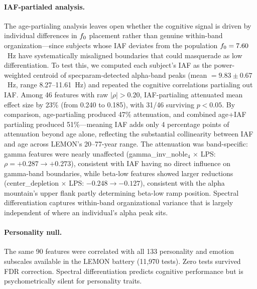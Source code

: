 \paragraph{IAF-partialed analysis.}
The age-partialing analysis leaves open whether the cognitive signal is driven by individual differences in $f_0$ placement rather than genuine within-band organization---since subjects whose IAF deviates from the population $f_0 = 7.60$~Hz have systematically misaligned boundaries that could masquerade as low differentiation. To test this, we computed each subject's IAF as the power-weighted centroid of specparam-detected alpha-band peaks (mean $= 9.83 \pm 0.67$~Hz, range 8.27--11.61~Hz) and repeated the cognitive correlations partialing out IAF. Among 46 features with raw $|\rho| > 0.20$, IAF-partialing attenuated mean effect size by 23\% (from 0.240 to 0.185), with 31/46 surviving $p < 0.05$. By comparison, age-partialing produced 47\% attenuation, and combined age+IAF partialing produced 51\%---meaning IAF adds only 4 percentage points of attenuation beyond age alone, reflecting the substantial collinearity between IAF and age across LEMON's 20--77-year range. The attenuation was band-specific: gamma features were nearly unaffected (gamma\_inv\_noble$_4$ $\times$ LPS: $\rho = +0.287 \to +0.273$), consistent with IAF having no direct influence on gamma-band boundaries, while beta-low features showed larger reductions (center\_depletion $\times$ LPS: $-0.248 \to -0.127$), consistent with the alpha mountain's upper flank partly determining beta-low ramp position. Spectral differentiation captures within-band organizational variance that is largely independent of where an individual's alpha peak sits.

\paragraph{Personality null.}
The same 90 features were correlated with all 133 personality and emotion subscales available in the LEMON battery (11,970 tests). Zero tests survived FDR correction. Spectral differentiation predicts cognitive performance but is psychometrically silent for personality traits.


